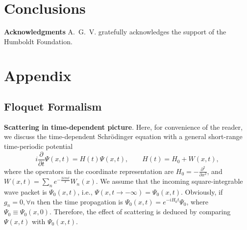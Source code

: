 \section{Conclusions}
\label{sec:concl}

{\small {\bf Acknowledgments} A.~G.~V. gratefully acknowledges the support of the Humboldt Foundation.}

\appendix

\section{Appendix}
\label{sec:formalism}

\subsection{Floquet Formalism}

{\bf Scattering in time-dependent picture}. Here, for convenience of the reader, we discuss the time-dependent Schr{\"o}dinger equation with a general short-range time-periodic potential
\begin{equation}
i\frac{\partial}{\partial t}\Psi(x,t)=H(t)\Psi(x,t),\qquad H(t)=H_0+W(x,t),
\label{eq:schr}
\end{equation}
where the operators in the coordinate representation are $H_0=-\frac{\partial^2}{\partial x^2}$, and $W(x,t)=\sum_n  e^{-\frac{2 i \pi n t}{T}} W_n(x)$. We assume that the incoming square-integrable wave packet is $\Psi_0(x,t)$, i.e., $\Psi(x,t\to-\infty)=\Psi_0(x,t)$. Obviously, if $g_n=0, \forall n$ then the time propagation is $\Psi_0(x,t)=e^{-i H_0 t}\Psi_0$, where $\Psi_0\equiv\Psi_0(x,0)$. Therefore, the effect of scattering is deduced by comparing $\Psi(x,t)$ with $\Psi_0(x,t)$. 

